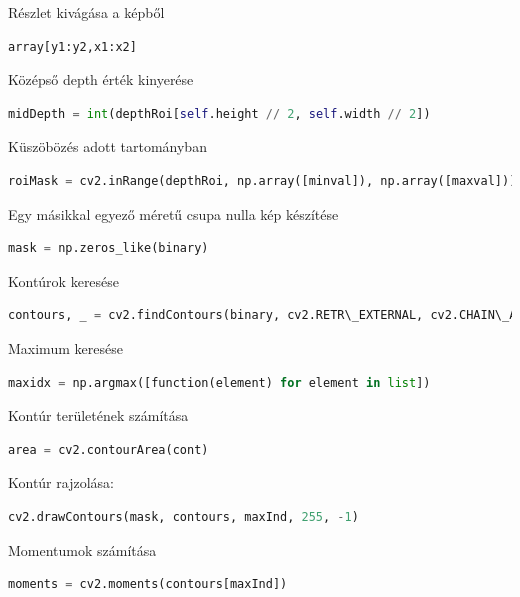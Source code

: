 \documentclass[12pt,a4paper,oneside]{report}             %
\begin{document}
Részlet kivágása a képből

\begin{lstlisting}[language=Python]
array[y1:y2,x1:x2]
\end{lstlisting}

Középső depth érték kinyerése

\begin{lstlisting}[language=Python]
midDepth = int(depthRoi[self.height // 2, self.width // 2])
\end{lstlisting}

Küszöbözés adott tartományban

\begin{lstlisting}[language=Python]
roiMask = cv2.inRange(depthRoi, np.array([minval]), np.array([maxval]))
\end{lstlisting}

Egy másikkal egyező méretű csupa nulla kép készítése

\begin{lstlisting}[language=Python]
mask = np.zeros_like(binary)
\end{lstlisting}

Kontúrok keresése

\begin{lstlisting}[language=Python]
contours, _ = cv2.findContours(binary, cv2.RETR\_EXTERNAL, cv2.CHAIN\_APPROX\_SIMPLE)
\end{lstlisting}

Maximum keresése

\begin{lstlisting}[language=Python]
maxidx = np.argmax([function(element) for element in list])
\end{lstlisting}

Kontúr területének számítása

\begin{lstlisting}[language=Python]
area = cv2.contourArea(cont)
\end{lstlisting}

Kontúr rajzolása:

\begin{lstlisting}[language=Python]
cv2.drawContours(mask, contours, maxInd, 255, -1)
\end{lstlisting}

Momentumok számítása

\begin{lstlisting}[language=Python]
moments = cv2.moments(contours[maxInd])
\end{lstlisting}
\end{document}
